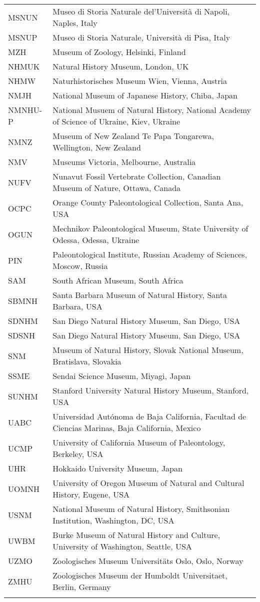 \begin{longtable}{lp{}}
MSNUN &
Museo di Storia Naturale del'Universit\`{a} di Napoli, Naples, Italy\\
MSNUP &
Museo di Storia Naturale, Universit\`{a} di Pisa, Italy\\
MZH & 
Museum of Zoology, Helsinki, Finland\\
NHMUK &
Natural History Museum, London, UK\\
NHMW &
Naturhistorisches Museum Wien, Vienna, Austria\\
NMJH &
National Museum of Japanese History, Chiba, Japan\\
NMNHU-P &
National Musuem of Natural History, National Academy of Science of Ukraine, Kiev, Ukraine\\
NMNZ &
Museum of New Zealand Te Papa Tongarewa, Wellington, New Zealand\\
NMV &
Museums Victoria, Melbourne, Australia\\
NUFV &
Nunavut Fossil Vertebrate Collection, Canadian Museum of Nature, Ottawa, Canada\\
OCPC &
Orange County Paleontological Collection, Santa Ana, USA\\
OGUN &
Mechnikov Paleontological Museum, State University of Odessa, Odessa, Ukraine\\
PIN &
Paleontological Institute, Russian Academy of Sciences, Moscow, Russia\\
SAM &
South African Museum, South Africa\\
SBMNH &
Santa Barbara Museum of Natural History, Santa Barbara, USA\\
SDNHM &
San Diego Natural History Museum, San Diego, USA\\
SDSNH &
San Diego Natural History Museum, San Diego, USA\\
SNM &
Museum of Natural History, Slovak National Museum, Bratislava, Slovakia\\
SSME &
Sendai Science Museum, Miyagi, Japan\\
SUNHM &
Stanford University Natural History Museum, Stanford, USA\\
UABC &
Universidad Aut\'{o}noma de Baja California, Facultad de Ciencias Marinas, Baja California, Mexico\\
UCMP &
University of California Museum of Paleontology, Berkeley, USA\\
UHR &
Hokkaido University Museum, Japan\\
UOMNH &
University of Oregon Museum of Natural and Cultural History, Eugene, USA\\
USNM &
National Museum of Natural History, Smithsonian Institution, Washington, DC, USA\\
UWBM &
Burke Museum of Natural History and Culture, University of Washington, Seattle, USA\\
UZMO &
Zoologisches Museum Universit\"{a}ts Oslo, Oslo, Norway\\
ZMHU &
Zoologisches Museum der Humboldt Universitaet, Berlin, Germany\\
\hline

\label{table-institutions}
\end{longtable}
